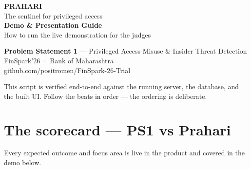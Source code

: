 \documentclass[11pt]{article}
\newcommand{\code}[1]{{\ttfamily\color{navy2}#1}}
\begin{document}
\begin{titlepage}
\centering
\vspace*{2.5cm}
{\Huge\bfseries\color{navy} PRAHARI}\\[4pt]
{\large\color{muted} The sentinel for privileged access}\\[1.4cm]
{\LARGE\bfseries\color{navy2} Demo \& Presentation Guide}\\[10pt]
{\large\color{ink} How to run the live demonstration for the judges}\\[1.4cm]
\begin{tcolorbox}[colback=light,colframe=navy,width=0.82\textwidth,arc=3pt,boxrule=1pt]
\centering\small
\textbf{Problem Statement 1} — Privileged Access Misuse \& Insider Threat Detection\\[3pt]
FinSpark'26 · Bank of Maharashtra\\[3pt]
\code{github.com/positromen/FinSpark-26-Trial}
\end{tcolorbox}
\vfill
{\small\color{muted} This script is verified end-to-end against the running server, the database,
and the built UI. Follow the beats in order — the ordering is deliberate.}
\vspace{1.5cm}
\end{titlepage}

\section{The scorecard --- PS1 vs Prahari}

Every expected outcome and focus area is live in the product and covered in the demo below.
\end{document}
